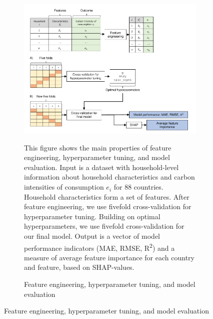 \begin{figure}[ht!]\ContinuedFloat
   \begin{subfigure}[b]{\textwidth}
  \centering
  \includegraphics{1_Figures/Figures_Appendix/Graphical representation of data work_2.pdf}
  \caption{Feature engineering, hyperparameter tuning, and model evaluation} \label{fig:data_visualisation_2}
  \begin{subcaption2}
    This figure shows the main properties of feature engineering, hyperparameter tuning, and model evaluation. Input is a dataset with household-level information about household characteristics and carbon intensities of consumption $e_{i}$ for 88 countries. Household characteristics form a set of features. After feature engineering, we use fivefold cross-validation for hyperparameter tuning. Building on optimal hyperparameters, we use fivefold cross-validation for our final model. Output is a vector of model performance indicators (MAE, RMSE, R\textsuperscript{2}) and a measure of average feature importance for each country and feature, based on SHAP-values.
  \end{subcaption2}
\end{subfigure}
\end{figure}

\clearpage

